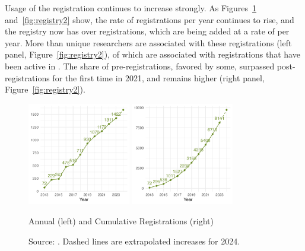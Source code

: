 Usage of the registration continues to increase strongly. As Figures~\ref{fig:registry1} and~\ref{fig:registry2} show, the rate of registrations per year continues to rise, and the registry now has over \regscumul{} registrations, which are being added at a rate of \regsyearly{} per year.  More than \registeredusers{} unique researchers are associated with these registrations (left panel, Figure~\ref{fig:registry2}), \activeusers{} of which are associated with registrations that have been active in \reportyear{}. The share of pre-registrations, favored by some, surpassed post-registrations for the first time in 2021, and remains higher (right panel, Figure~\ref{fig:registry2}). 


\begin{figure}
\centering
\includegraphics[width=0.4\textwidth]{data/registry/Output/reg_pre_year_2023.png}
\includegraphics[width=0.4\textwidth]{data/registry/Output/reg_cumulative_2023.png}
\caption{Annual (left) and Cumulative Registrations (right) }
    \label{fig:registry1}
\caption*{\footnotesize Source: \citet{DVN/2RZF2X_2024}. Dashed lines are extrapolated increases for 2024.}
\end{figure}

